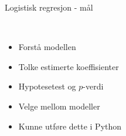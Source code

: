 \documentclass[10pt,ignorenonframetext,]{beamer}
\providecommand{\tightlist}{%
  \setlength{\itemsep}{0pt}\setlength{\parskip}{0pt}}
\begin{document}
\begin{frame}{Logistisk regresjon - mål}
\protect\hypertarget{logistisk-regresjon---muxe5l}{}

\(~\)

\begin{itemize}
\tightlist
\item
  Forstå modellen
\end{itemize}

\vspace{2mm}

\begin{itemize}
\tightlist
\item
  Tolke estimerte koeffisienter
\end{itemize}

\vspace{2mm}

\begin{itemize}
\tightlist
\item
  Hypotesetest og \(p\)-verdi
\end{itemize}

\vspace{2mm}

\begin{itemize}
\tightlist
\item
  Velge mellom modeller
\end{itemize}

\vspace{2mm}

\begin{itemize}
\tightlist
\item
  Kunne utføre dette i Python
\end{itemize}

\end{frame}
\end{document}
